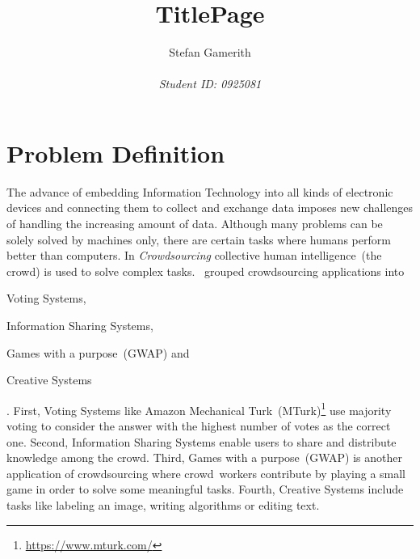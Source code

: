 \documentclass[12pt, notitlepage]{article}
\title{TitlePage}
\author{Stefan Gamerith\\\\
		\emph{Student ID: 0925081}}
\begin{document}
	\maketitle
	\thispagestyle{empty}
	\newpage
\setcounter{page}{1}

\section{Problem Definition}
The advance of embedding Information Technology into all kinds of electronic devices and connecting them to collect and exchange data imposes new challenges of handling the increasing amount of data. Although many problems can be solely solved by machines only, there are certain tasks where humans perform better than computers. In \emph{Crowdsourcing} collective human intelligence~(the crowd) is used to solve complex tasks. \citet{yuen2011survey}~grouped crowdsourcing applications into 
\begin{inparaenum}[1)]
		\item Voting Systems,
		\item Information Sharing Systems,
		\item Games with a purpose~(GWAP) and
		\item Creative Systems
\end{inparaenum}. 
First, Voting Systems like Amazon Mechanical Turk~(MTurk)\footnote{\url{https://www.mturk.com/}} use majority voting to consider the answer with the highest number of votes as the correct one. Second, Information Sharing Systems enable users to share and distribute knowledge among the crowd. Third, Games with a purpose~(GWAP) is another application of crowdsourcing where crowd~workers contribute by playing a small game in order to solve some meaningful tasks. Fourth, Creative Systems include tasks like labeling an image, writing algorithms or editing text. 
\end{document}
